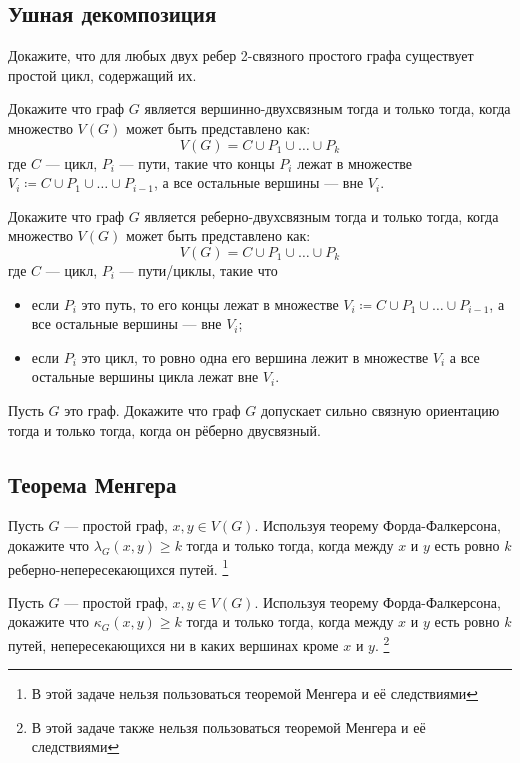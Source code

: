 \documentclass[a4paper,12pt,twoside]{article}
\begin{document}
\subsection*{Ушная декомпозиция}
\begin{?}
    Докажите, что для любых двух ребер 2-связного простого графа существует простой цикл, содержащий их.
\end{?}
\begin{?}
    Докажите что граф \(G\) является вершинно-двухсвязным тогда и только тогда, когда множество \(V(G)\) может быть представлено как:
    \[
        V(G) = C \cup P_1 \cup \ldots \cup P_k
    \] 
    где \(C\) --- цикл, \(P_i\) --- пути, такие что концы \(P_i\) лежат в множестве \(V_i \coloneqq C \cup P_1 \cup \ldots \cup P_{i-1}\), а все остальные вершины --- вне \(V_i\).
\end{?}
\begin{?}
    Докажите что граф \(G\) является реберно-двухсвязным тогда и только тогда, когда множество \(V(G)\) может быть представлено как:
    \[
        V(G) = C \cup P_1 \cup \ldots \cup P_k
    \] 
    где \(C\) --- цикл, \(P_i\) --- пути/циклы, такие что
    \begin{itemize}[noitemsep, topsep=0pt,parsep=0pt]
        \item если \(P_i\) это путь, то его концы лежат в множестве \(V_i \coloneqq C \cup P_1 \cup \ldots \cup P_{i-1}\), а все остальные вершины --- вне \(V_i\);
        \item если \(P_i\) это цикл, то ровно одна его вершина лежит в множестве \(V_i\) а все остальные вершины цикла лежат вне \(V_i\).
    \end{itemize}
\end{?}
\begin{?}
    Пусть \(G\) это граф. Докажите что граф \(G\) допускает сильно связную ориентацию тогда и только тогда, когда он рёберно двусвязный.
\end{?}

\subsection*{Теорема Менгера}
\begin{?}
    Пусть \(G\) --- простой граф, \(x, y \in V(G)\). Используя теорему Форда-Фалкерсона, докажите что \(\lambda_G(x, y) \geqslant k\) тогда и только тогда, когда между \(x\) и \(y\) есть ровно \(k\) реберно-непересекающихся путей. \footnote{В этой задаче нельзя пользоваться теоремой Менгера и её следствиями}
\end{?}
\begin{?}
    Пусть \(G\) --- простой граф, \(x, y \in V(G)\). Используя теорему Форда-Фалкерсона, докажите что \(\kappa_G(x, y) \geqslant k\) тогда и только тогда, когда между \(x\) и \(y\) есть ровно \(k\) путей, непересекающихся ни в каких вершинах кроме \(x\) и \(y\). \footnote{В этой задаче также нельзя пользоваться теоремой Менгера и её следствиями}
\end{?}
\end{document}
